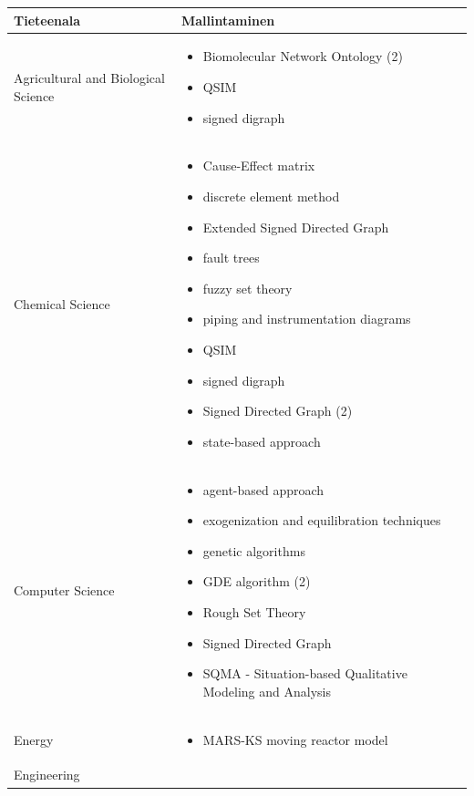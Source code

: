 \documentclass[utf8]{gradu3}
\begin{document}
\begin{longtable}[h]{|p{5cm}|p{8cm}|}
    \hline
    \textbf{Tieteenala}    &    \textbf{Mallintaminen}\\
    \hline
    Agricultural and Biological Science & \begin{itemize}
        \item Biomolecular Network Ontology (2)
        \item QSIM
        \item signed digraph
    \end{itemize} \\
    \hline
    Chemical Science & \begin{itemize}
        \item Cause-Effect matrix
        \item discrete element method
        \item Extended Signed Directed Graph
        \item fault trees
        \item fuzzy set theory
        \item piping and instrumentation diagrams
        \item QSIM
        \item signed digraph
        \item Signed Directed Graph (2)       
        \item state-based approach
    \end{itemize} \\
    \hline
    Computer Science & \begin{itemize}
        \item agent-based approach
        \item exogenization and equilibration techniques
        \item genetic algorithms
        \item GDE algorithm (2)
        \item Rough Set Theory
        \item Signed Directed Graph
        \item SQMA - Situation-based Qualitative Modeling and Analysis
    \end{itemize} \\
    \hline
    Energy & \begin{itemize}
        \item MARS-KS moving reactor model
    \end{itemize} \\
    \hline
    Engineering & \begin{itemize}

\end{itemize}
\end{longtable}
\end{document}
